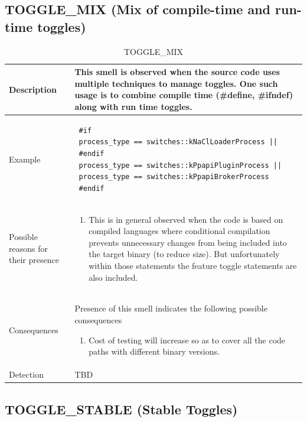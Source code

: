 \documentclass[conference]{IEEEtran}
\begin{document}
\subsection{TOGGLE\_MIX (Mix of compile-time and run-time toggles)}

\begin{table}[h]
\caption{TOGGLE\_MIX}
\centering
\begin{tabular}{|p{1.5cm}|p{6.6cm}|}
 \hline\hline
 Description & This smell is observed when the source code uses multiple techniques to manage toggles. One such usage is to combine compile time (\#define, \#ifndef) along with run time toggles.  \\ \hline

 Example & 
 \begin{lstlisting}
 #if
 process_type == switches::kNaClLoaderProcess ||
 #endif
 process_type == switches::kPpapiPluginProcess ||
 process_type == switches::kPpapiBrokerProcess
 #endif
 \end{lstlisting}
 
 \\ \hline

Possible reasons for their presence & 
\begin{enumerate}
	\item This is in general observed when the code is based on compiled languages where conditional compilation prevents unnecessary changes from being included into the target binary (to reduce size). But unfortunately within those statements the feature toggle statements are also included.
\end{enumerate}	 
 \\ \hline
 Consequences & 
 Presence of this smell indicates the following possible consequences
 \begin{enumerate}
	\item Cost of testing will increase so as to cover all the code paths with different binary versions.
\end{enumerate}
 \\ \hline

 Detection & TBD \\ \hline
\end{tabular}
\label{table:chrome-dir-data}
\end{table}

\subsection{TOGGLE\_STABLE (Stable Toggles)}
\end{document}
